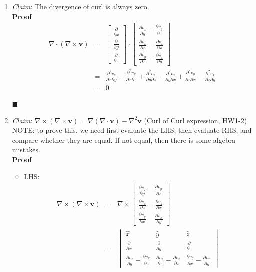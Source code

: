 \documentclass[12pt,a4paper,twoside]{article}
\begin{document}
	\begin{enumerate}
		\item \textit{Claim}: The divergence of curl is always zero.\\
		\textbf{Proof}
		\begin{eqnarray*}
			\nabla \cdot (\nabla \times \textbf{v}) &=& \begin{bmatrix}\frac{\partial}{\partial x}\\\frac{\partial}{\partial y} \\\frac{\partial}{\partial z} \end{bmatrix}\cdot \begin{bmatrix}\frac{\partial v_z}{\partial y}-\frac{\partial v_y}{\partial z}\\\frac{\partial v_x}{\partial z}-\frac{\partial v_z}{\partial x}\\\frac{\partial v_y}{\partial x}-\frac{\partial v_x}{\partial y}\end{bmatrix}\\
			&=& \frac{\partial^2v_z}{\partial x\partial y}-\frac{\partial^2 v_y}{\partial x\partial z}+\frac{\partial^2 v_x}{\partial y\partial z}-\frac{\partial^2 v_z}{\partial y\partial x}+\frac{\partial^2 v_y}{\partial z\partial x}-\frac{\partial^2 v_x}{\partial z\partial y}\\
			&=& 0
		\end{eqnarray*}
		\begin{flushright}
			$\blacksquare$
		\end{flushright}
		
		\item \textit{Claim}: \(\nabla \times (\nabla\times \textbf{v})=\nabla (\nabla\cdot \textbf{v})-\nabla^2\textbf{v}\) (Curl of Curl expression, HW1-2)\\
		
		NOTE: to prove this, we need first evaluate the LHS, then evaluate RHS, and compare whether they are equal. If not equal, then there is some algebra mistakes.\\
		
		\textbf{Proof}
		\begin{itemize}
			\item LHS:
			\begin{eqnarray*}
				\nabla \times (\nabla \times \textbf{v}) &=& \nabla \times \begin{bmatrix}\frac{\partial v_z}{\partial y}-\frac{\partial v_y}{\partial z}\\\frac{\partial v_x}{\partial z}-\frac{\partial v_z}{\partial x}\\\frac{\partial v_y}{\partial x}-\frac{\partial v_x}{\partial y}\end{bmatrix}\\
				&=& \begin{vmatrix}
					\hat{x}	& \hat{y} & \hat{z} \\ 
					\frac{\partial}{\partial x}	&\frac{\partial}{\partial y}  & \frac{\partial}{\partial z}\\ 
					\frac{\partial v_z}{\partial y}-\frac{\partial v_y}{\partial z}	&\frac{\partial v_x}{\partial z}-\frac{\partial v_z}{\partial x}  & \frac{\partial v_y}{\partial x}-\frac{\partial v_x}{\partial y}
					

\end{vmatrix}
\end{eqnarray*}
\end{itemize}
\end{enumerate}
\end{document}
